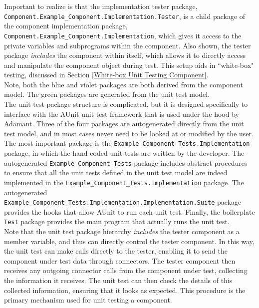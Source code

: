 Important to realize is that the implementation tester package, \texttt{Component.Example\_Component.Implementation.Tester}, is a child package of the component implementation package, \texttt{Component.Example\_Component.Implementation}, which gives it access to the private variables and subprograms within the component. Also shown, the tester package \textit{includes} the component within itself, which allows it to directly access and manipulate the component object during test. This setup aids in ``white-box" testing, discussed in Section \ref{White-box Unit Testing Component}. \\

Note, both the blue and violet packages are both derived from the component model. The green packages are generated from the unit test model. \\

The unit test package structure is complicated, but it is designed specifically to interface with the AUnit unit test framework that is used under the hood by Adamant. Three of the four packages are autogenerated directly from the unit test model, and in most cases never need to be looked at or modified by the user. The most important package is the \texttt{Example\_Component\_Tests.Implementation} package, in which the hand-coded unit tests are written by the developer. The autogenerated \texttt{Example\_Component\_Tests} package includes abstract procedures to ensure that all the unit tests defined in the unit test model are indeed implemented in the \texttt{Example\_Component\_Tests.Implementation} package. The autogenerated \texttt{Example\_Component\_Tests.Implementation.Implementation.Suite} package provides the hooks that allow AUnit to run each unit test. Finally, the boilerplate \texttt{Test} package provides the main program that actually runs the unit test. \\

Note that the unit test package hierarchy \textit{includes} the tester component as a member variable, and thus can directly control the tester component. In this way, the unit test can make calls directly to the tester, enabling it to send the component under test data through connectors. The tester component then receives any outgoing connector calls from the component under test, collecting the information it receives. The unit test can then check the details of this collected information, ensuring that it looks as expected. This procedure is the primary mechanism used for unit testing a component. \\

